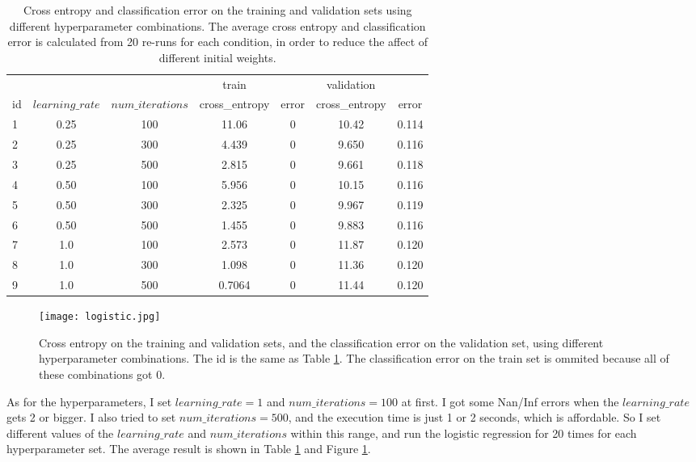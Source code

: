\documentclass{article}
\begin{document}
\begin{table}[htbp]
\centering
\begin{tabular}{lcc|cc|cc}
\toprule
\ & \ & \ & train & \ & validation & \\
id & $learning\_rate$ & $num\_iterations$ & cross\_entropy & error & cross\_entropy & error \\
\midrule
1 & 0.25 & 100 & 11.06  & 0 & 10.42 & 0.114\\
2 & 0.25 & 300 & 4.439  & 0 & 9.650 & 0.116\\
3 & 0.25 & 500 & 2.815  & 0 & 9.661 & 0.118\\
4 & 0.50 & 100 & 5.956  & 0 & 10.15 & 0.116\\
5 & 0.50 & 300 & 2.325  & 0 & 9.967 & 0.119\\
6 & 0.50 & 500 & 1.455  & 0 & 9.883 & 0.116\\
7 & 1.0  & 100 & 2.573  & 0 & 11.87 & 0.120\\
8 & 1.0  & 300 & 1.098  & 0 & 11.36 & 0.120\\
9 & 1.0  & 500 & 0.7064 & 0 & 11.44 & 0.120\\
\bottomrule
\end{tabular}
\caption{Cross entropy and classification error on the training and validation sets using different hyperparameter combinations. The average cross entropy and classification error is calculated from 20 re-runs for each condition, in order to reduce the affect of different initial weights. 
\label{table:hyper}}
\end{table} 

\begin{figure}[htbp]
\centering
\texttt{[image: logistic.jpg]}
\caption{Cross entropy on the training and validation sets, and the classification error on the validation set, using different hyperparameter combinations. The id is the same as Table \ref{table:hyper}. The classification error on the train set is ommited because all of these combinations got 0.
\label{fig:logistic}}
\end{figure}

As for the hyperparameters, I set $learning\_rate=1$ and $num\_iterations=100$ at first. I got some Nan/Inf errors when the $learning\_rate$ gets 2 or bigger. I also tried to set $num\_iterations=500$, and the execution time is just 1 or 2 seconds, which is affordable. So I set different values of the $learning\_rate$ and $num\_iterations$ within this range, and run the logistic regression for 20 times for each hyperparameter set. The average result is shown in Table \ref{table:hyper} and Figure \ref{fig:logistic}.\\
\end{document}
